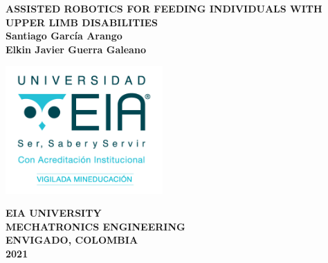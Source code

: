 \documentclass[11pt]{report} %
\begin{document}

\begin{titlepage}

\begin{center}

\begin{Large}

\vspace*{1cm}
\textbf{ASSISTED ROBOTICS FOR FEEDING INDIVIDUALS WITH UPPER LIMB DISABILITIES}\\[6.5cm]

\textbf{Santiago García Arango} \\
\textbf{Elkin Javier Guerra Galeano}

\end{Large}

\vfill

\includegraphics[width=6cm]{assets/imgs/logoeia.png}\\

\begin{large}
\textbf{EIA UNIVERSITY}\\
\textbf{MECHATRONICS ENGINEERING}\\
\textbf{ENVIGADO, COLOMBIA}\\
\textbf{2021}\\
\end{large}
\end{center}
\end{titlepage}

\end{document}
